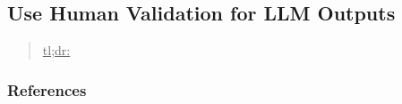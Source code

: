 



\subsection{Use Human Validation for LLM Outputs}
\label{sec:use-human-validation-for-llm-outputs}

\begin{quote}
\underline{tl;dr:} 
\end{quote}



\subsubsection{References}






